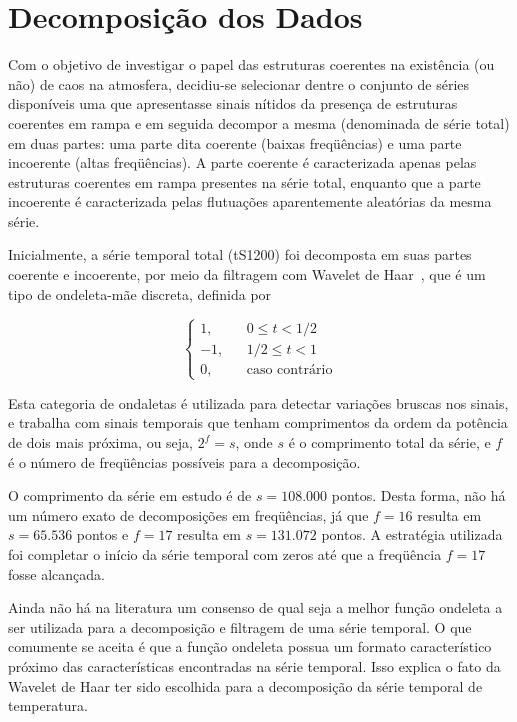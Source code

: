 \section{Decomposição dos Dados}

Com o objetivo de investigar o papel das estruturas coerentes na existência (ou não) de caos na atmosfera, decidiu-se selecionar dentre o conjunto de séries disponíveis uma que apresentasse sinais nítidos da presença de estruturas coerentes em rampa e em seguida decompor a mesma (denominada de série total) em duas partes: uma parte dita coerente (baixas freqüências) e uma parte incoerente (altas freqüências). A parte coerente é caracterizada apenas pelas estruturas coerentes em rampa presentes na série total, enquanto que a parte incoerente é caracterizada pelas flutuações aparentemente aleatórias da mesma série. 


Inicialmente, a série temporal total (tS1200) foi decomposta em suas partes coerente e incoerente, por meio da filtragem com Wavelet de Haar~\cite{katul/94}, que é um tipo de ondeleta-mãe discreta, definida por

\begin{equation}
\left\{ \begin{array}{rrr} 1, &  & 0\leq t < 1/2 \\
                  -1, &  & 1/2\leq t < 1 \\
		   0, &  & \mbox{caso contrário}
\end{array} 
\right.
\label{eqwavelethaar}
\end{equation} 

Esta categoria de ondaletas é utilizada para detectar variações bruscas nos sinais, e trabalha com sinais temporais que tenham comprimentos da ordem da potência de dois mais próxima, ou seja, $2^{f}=s$, onde $s$ é o comprimento total da série, e $f$ é o número de freqüências possíveis para a decomposição. 

O comprimento da série em estudo é de $s=108.000$ pontos. Desta forma, não há um número exato de decomposições em freqüências, já que $f=16$ resulta em $s=65.536$ pontos e $f=17$ resulta em $s=131.072$ pontos. A estratégia utilizada foi completar o início da série temporal com zeros até que a freqüência $f=17$ fosse alcançada. 
 
Ainda não há na literatura um consenso de qual seja a melhor função ondeleta a ser utilizada para a decomposição e filtragem de uma série temporal. O que comumente se aceita é que a função ondeleta possua um formato característico próximo das características encontradas na série temporal. Isso explica o fato da Wavelet de Haar ter sido escolhida para a decomposição da série temporal de temperatura.  

